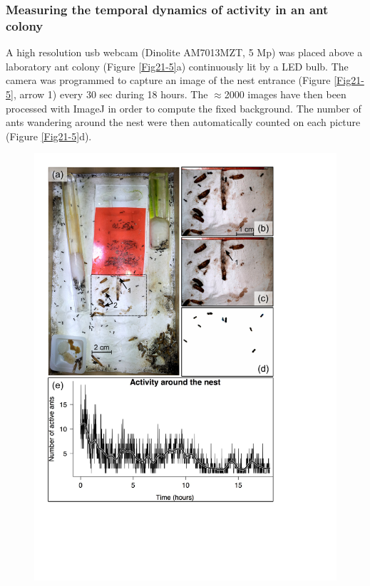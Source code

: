 \subsubsection{Measuring the temporal dynamics of activity in an ant colony}

A high resolution usb webcam (Dinolite AM7013MZT, 5 Mp) was placed above a
laboratory ant colony (Figure \ref{Fig21-5}a) continuously lit by a LED bulb. The camera was
programmed to capture an image of the nest entrance (Figure \ref{Fig21-5}, arrow 1) every 30
sec during 18 hours. The $\approx$2000 images have then been processed with ImageJ in
order to compute the fixed background. The number of ants wandering around the
nest were then automatically counted on each picture (Figure \ref{Fig21-5}d).

\begin{figure}[!ht] %
\centering
\includegraphics[height=0.60\textheight]{2_Methodo/Fig/5_Fourmis.pdf} 

\end{figure}
